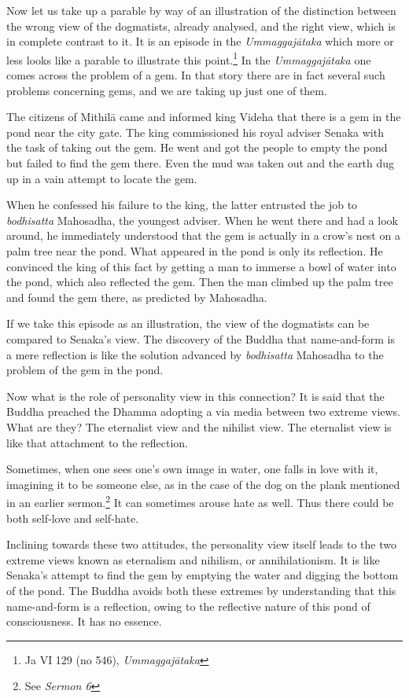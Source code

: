 Now let us take up a parable by way of an illustration of the distinction between the wrong view of the dogmatists, already analysed, and the right view, which is in complete contrast to it. It is an episode in the \emph{Ummaggajātaka} which more or less looks like a parable to illustrate this point.\footnote{Ja VI 129 (no 546), \emph{Ummaggajātaka}} In the \emph{Ummaggajātaka} one comes across the problem of a gem. In that story there are in fact several such problems concerning gems, and we are taking up just one of them.

The citizens of Mithilā came and informed king Videha that there is a gem in the pond near the city gate. The king commissioned his royal adviser Senaka with the task of taking out the gem. He went and got the people to empty the pond but failed to find the gem there. Even the mud was taken out and the earth dug up in a vain attempt to locate the gem.

When he confessed his failure to the king, the latter entrusted the job to \emph{bodhisatta} Mahosadha, the youngest adviser. When he went there and had a look around, he immediately understood that the gem is actually in a crow's nest on a palm tree near the pond. What appeared in the pond is only its reflection. He convinced the king of this fact by getting a man to immerse a bowl of water into the pond, which also reflected the gem. Then the man climbed up the palm tree and found the gem there, as predicted by Mahosadha.

\clearpage

If we take this episode as an illustration, the view of the dogmatists can be compared to Senaka's view. The discovery of the Buddha that name-and-form is a mere reflection is like the solution advanced by \emph{bodhisatta} Mahosadha to the problem of the gem in the pond.

Now what is the role of personality view in this connection? It is said that the Buddha preached the Dhamma adopting a via media between two extreme views. What are they? The eternalist view and the nihilist view. The eternalist view is like that attachment to the reflection.

Sometimes, when one sees one's own image in water, one falls in love with it, imagining it to be someone else, as in the case of the dog on the plank mentioned in an earlier sermon.\footnote{See \emph{Sermon 6}} It can sometimes arouse hate as well. Thus there could be both self-love and self-hate.

Inclining towards these two attitudes, the personality view itself leads to the two extreme views known as eternalism and nihilism, or annihilationism. It is like Senaka's attempt to find the gem by emptying the water and digging the bottom of the pond. The Buddha avoids both these extremes by understanding that this name-and-form is a reflection, owing to the reflective nature of this pond of consciousness. It has no essence.

